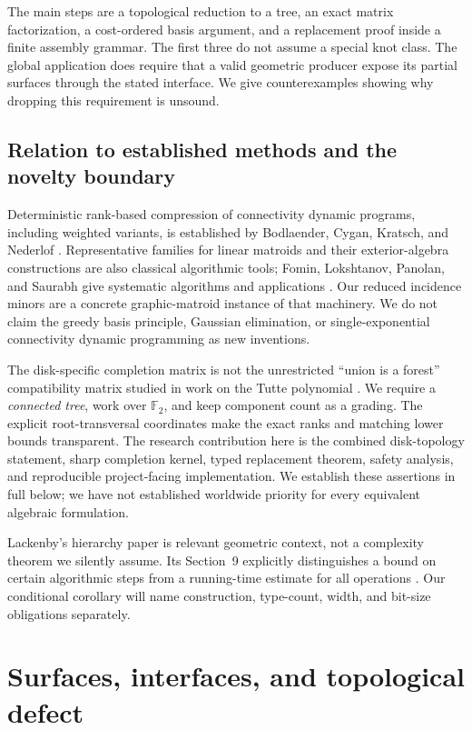 \documentclass[11pt,a4paper]{article}
\theoremstyle{definition}
\theoremstyle{remark}
\newcommand{\F}{\mathbb F_2}
\begin{document}
The main steps are a topological reduction to a tree, an exact matrix factorization,
a cost-ordered basis argument, and a replacement proof inside a finite assembly grammar.
The first three do not assume a special knot class. The global application does require
that a valid geometric producer expose its partial surfaces through the stated interface.
We give counterexamples showing why dropping this requirement is unsound.

\subsection{Relation to established methods and the novelty boundary}
Deterministic rank-based compression of connectivity dynamic programs, including weighted
variants, is established by Bodlaender, Cygan, Kratsch, and Nederlof \cite{bckn}.
Representative families for linear matroids and their exterior-algebra constructions are
also classical algorithmic tools; Fomin, Lokshtanov, Panolan, and Saurabh give systematic
algorithms and applications \cite{flps,products}. Our reduced incidence minors are a
concrete graphic-matroid instance of that machinery. We do not claim the greedy basis
principle, Gaussian elimination, or single-exponential connectivity dynamic programming
as new inventions.

The disk-specific completion matrix is not the unrestricted ``union is a forest''
compatibility matrix studied in work on the Tutte polynomial \cite{mannens}.
We require a \emph{connected tree}, work over $\F$, and keep component count as a grading.
The explicit root-transversal coordinates make the exact ranks and matching lower bounds
transparent. The research contribution here is the combined disk-topology statement,
sharp completion kernel, typed replacement theorem, safety analysis, and reproducible
project-facing implementation. We establish these assertions in full below; we have not
established worldwide priority for every equivalent algebraic formulation.

Lackenby's hierarchy paper is relevant geometric context, not a complexity theorem we
silently assume. Its Section~9 explicitly distinguishes a bound on certain algorithmic
steps from a running-time estimate for all operations \cite{lackenby}. Our conditional
corollary will name construction, type-count, width, and bit-size obligations separately.

\section{Surfaces, interfaces, and topological defect}\label{sec:defect}
\end{document}
